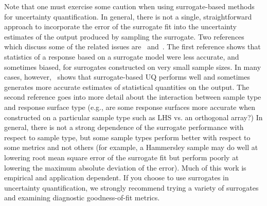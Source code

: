 Note that one must exercise some caution when using surrogate-based methods 
for uncertainty quantification. In general, there is not a single, 
straightforward approach to incorporate the error of the surrogate fit 
into the uncertainty estimates of the output produced by sampling the surrogate.
Two references which discuss some of the related 
issues are~\cite{Giu06} and~\cite{Swi06}. The first reference shows that 
statistics of a response based on a surrogate model were less accurate, and 
sometimes biased, for surrogates constructed on very small sample sizes.  
In many cases, however,~\cite{Giu06} shows that surrogate-based UQ performs 
well and sometimes generates more accurate estimates of statistical
quantities on the output.  The second reference goes into more detail 
about the interaction between sample type and response surface type (e.g., 
are some response surfaces more accurate when constructed on a particular 
sample type such as LHS vs. an orthogonal array?) In general, there is not 
a strong dependence of the surrogate performance with respect to sample type, 
but some sample types perform better with respect to some metrics and not 
others (for example, a Hammersley sample may do well at lowering root mean 
square error of the surrogate fit but perform poorly at lowering the maximum 
absolute deviation of the error).  Much of this work is empirical and 
application dependent.  If you choose to use surrogates in uncertainty 
quantification, we strongly recommend trying a variety of surrogates 
and examining diagnostic goodness-of-fit metrics. 
